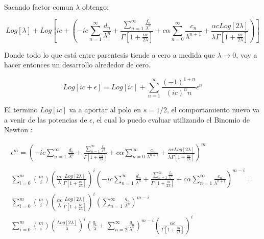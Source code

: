 Sacando factor comun $\lambda$ obtengo:

\begin{equation}
Log[\lambda] + 
Log \left[
	 i  c +
	\left(
		- i c \sum _{n=1} ^{\infty} \frac{d _n}{\lambda ^n} +
		\frac{\sum _{n=1} ^{\infty} \frac{f _n}{\lambda ^n}}
			 {\Gamma[1+ \frac{i \alpha}{2 \lambda}]}		
		+ c \alpha \sum _{n=0} ^{\infty} \frac{c _n}{\lambda ^{n+1}} +
		\frac{\alpha c Log[2 \lambda]}{\lambda \Gamma [1 + \frac{i \alpha}{2 \lambda} ]}	
		\right)
		\right]		
\end{equation}


Donde todo lo que está entre parentesis tiende a cero a medida que $\lambda \rightarrow 0$, voy a hacer entonces un desarrollo alrededor de cero.

\begin{equation}
Log[i c + \epsilon] =
Log[i c] + 
\sum _{n=1} ^{\infty}
	\frac{(-1) ^{1+n} }
     	{(i c) ^n n}
     \epsilon ^{n}
\end{equation}

El termino $Log[i c]$ va a aportar al polo en $s=1/2$, el comportamiento nuevo va a venir de las potencias de $\epsilon$, el cual lo puedo evaluar utilizando el Binomio de Newton :



\begin{equation}
\begin{array}{c}
	\epsilon ^m = 
	\left(
		- i c \sum _{n=1} ^{\infty} \frac{d _n}{\lambda ^n} +
		\frac{\sum _{n=1} ^{\infty} \frac{f _n}{\lambda ^n}}
			 {\Gamma[1+ \frac{i \alpha}{2 \lambda}]}		
		+ c \alpha \sum _{n=0} ^{\infty} \frac{c _n}{\lambda ^{n+1}} +
		\frac{\alpha c Log[2 \lambda]}{\lambda \Gamma [1 + \frac{i \alpha}{2 \lambda} ]}
		\right) ^m \\ \\
\sum _{i=0} ^{m}
{m\choose i}
\left(
	\frac{\alpha c}{\lambda} \frac{Log [2 \lambda]}{\Gamma [1 + \frac{i \alpha}{2 \lambda}]}
	\right) ^{i}
\left(
	- i c \sum _{n=1} ^{\infty} \frac{d _n}{\lambda ^n} +
	\frac{\sum _{n=1} ^{\infty} \frac{f _n}{\lambda ^{n}}}
		{\Gamma[1+ \frac{i \alpha}{2 \lambda}]}		
		+ c \alpha \sum _{n=1} ^{\infty} \frac{c _n}{\lambda ^{n+1}} 
	\right) ^{m-i } = \\
\sum _{i=0} ^{m}
{m\choose i}
\left(
	\frac{\alpha c}{\lambda} \frac{Log [2 \lambda]}{\Gamma [1+ \frac{i \alpha}{2 \lambda}]}
	\right) ^{i} 
\left(
	\sum _{n=1} ^{\infty} \frac{q_n}{\lambda ^n}
\right) ^{m-i} \\
\sum _{i=0} ^{m}
{m\choose i}
\left(
	\frac{Log [2 \lambda]}{ \lambda }
	\right) ^{i} 
\left(
	\frac{q_1}{\lambda} + \sum _{n=2} ^{\infty} \frac{q_n}{\lambda ^n}
\right) ^{m-i} 
\left(
	\frac{\alpha c}{\Gamma [1+ \frac{i \alpha}{2 \lambda}]}
	\right) ^i \\
\end{array}
\end{equation}

